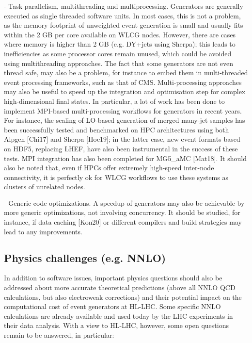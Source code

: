 \documentclass[10pt,a4paper]{article}
\begin{document}
- {Task parallelism, multithreading and multiprocessing}. Generators are
generally executed as single threaded software units. In most cases,
this is not a problem, as the memory footprint of unweighted event
generation is small and usually fits within the 2 GB per core available
on WLCG nodes. However, there are cases where memory is higher than 2 GB
(e.g. DY+jets using Sherpa); this leads to inefficiencies as some
processor cores remain unused, which could be avoided using
multithreading approaches. The fact that some generators are not even
thread safe, may also be a problem, for instance to embed them in
multi-threaded event processing frameworks, such as that of CMS.
Multi-processing approaches may also be useful to speed up the
integration and optimisation step for complex high-dimensional final
states. In particular, a lot of work has been done to implement
MPI-based multi-processing workflows for generators in recent years. For
instance, the scaling of LO-based generation of merged many-jet samples
has been successfully tested and benchmarked on HPC architectures using
both Alpgen {[}Chi17{]} and Sherpa {[}Hoe19{]}; in the latter case, new
event formats based on HDF5, replacing LHEF, have also been instrumental
in the success of these tests. MPI integration has also been completed
for MG5\_aMC {[}Mat18{]}. It should also be noted that, even if HPCs
offer extremely high-speed inter-node connectivity, it is perfectly ok
for WLCG workflows to use these systems as clusters of unrelated nodes.

- {Generic code optimizations}. A speedup of generators may also be
achievable by more generic optimizations, not involving concurrency. It
should be studied, for instance, if data caching {[}Kon20{]} or
different compilers and build strategies may lead to any improvements.

\hypertarget{physics-challenges-e.g.-nnlo}{%
\subsection{Physics challenges (e.g.
NNLO)}\label{physics-challenges-e.g.-nnlo}}

In addition to software issues, important physics questions should also
be addressed about more accurate theoretical predictions (above all NNLO
QCD calculations, but also electroweak corrections) and their potential
impact on the computational cost of event generators at HL-LHC. Some
specific NNLO calculations are already available and used today by the
LHC experiments in their data analysis. With a view to HL-LHC, however,
some open questions remain to be answered, in particular:
\end{document}
